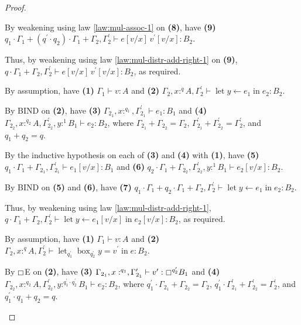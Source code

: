 \documentclass[acmsmall,screen,nonacm]{acmart}
\DeclareMathOperator{\llet}{\text{let}}
\DeclareMathOperator{\lin}{\text{in}}
\DeclareMathOperator{\bbox}{\text{box}}
\newcommand{\tee}{\vdash}
\begin{document}
\begin{proof}
\begin{description}
    By weakening using law \ref{law:mul-assoc-1} on \textbf{(8)}, have \textbf{(9)} $q_1 \cdot \Gamma_1 + (q^\prime \cdot q_2) \cdot \Gamma_1 + \Gamma_2, \Gamma_2^\prime \tee e[v/x] \, v^\prime[v/x] : B_2$.

    Thus, by weakening using law \ref{law:mul-distr-add-right-1} on \textbf{(9)}, $q \cdot \Gamma_1 + \Gamma_2, \Gamma_2^\prime \tee e[v/x] \, v^\prime[v/x] : B_2$, as required.
    \\
    \item[Case BIND.] 
    By assumption, have \textbf{(1)} $\Gamma_1 \tee v : A$ and \textbf{(2)} $\Gamma_2, x :^q A, \Gamma_2^\prime \tee \llet y \leftarrow e_1 \lin e_2 : B_2$.

    By BIND on \textbf{(2)}, have \textbf{(3)} $\Gamma_{2_1}, x :^{q_1}, \Gamma_{2_1}^\prime \tee e_1 : B_1$ and \textbf{(4)} $\Gamma_{2_2}, x :^{q_2} A, \Gamma_{2_2}^\prime, y :^1 B_1 \tee e_2 : B_2$, where $\Gamma_{2_1} + \Gamma_{2_2} = \Gamma_2$, $\Gamma_{2_1}^\prime + \Gamma_{2_2}^\prime = \Gamma_2^\prime$, and $q_1 + q_2 = q$.

    By the inductive hypothesis on each of \textbf{(3)} and \textbf{(4)} with \textbf{(1)}, have \textbf{(5)} $q_1 \cdot \Gamma_1 + \Gamma_{2_1}, \Gamma_{2_1}^\prime \tee e_1[v/x] : B_1$ and \textbf{(6)} $q_2 \cdot \Gamma_1 + \Gamma_{2_2}, \Gamma_{2_2}^\prime, y :^1 B_1 \tee e_2[v/x] : B_2$.

    By BIND on \textbf{(5)} and \textbf{(6)}, have \textbf{(7)} $q_1 \cdot \Gamma_1 + q_2 \cdot \Gamma_1 + \Gamma_2, \Gamma_2^\prime \tee \llet y \leftarrow e_1 \lin e_2 : B_2$.

    Thus, by weakening using law \ref{law:mul-distr-add-right-1}, $q \cdot \Gamma_1 + \Gamma_2, \Gamma_2^\prime \tee \llet y \leftarrow e_1[v/x] \lin e_2[v/x] : B_2$, as required.
    \\
    \item[Case $\boxempty$E.]
    By assumption, have \textbf{(1)} $\Gamma_1 \tee v : A$ and \textbf{(2)} $\Gamma_2, x :^q A, \Gamma_2^\prime \tee \llet_{q_1^\prime} \bbox_{q_2^\prime} y = v^\prime \lin e : B_2$.
    
    By $\boxempty$E on \textbf{(2)}, have \textbf{(3)} $\Gamma_{2_1}, x :^{q_1}, \Gamma_{2_1}^\prime \tee v^\prime : \boxempty^{q_2^\prime} B_1$ and \textbf{(4)} $\Gamma_{2_2}, x :^{q_2} A, \Gamma_{2_2}^\prime, y :^{q_1^\prime \cdot q_2^\prime} B_1 \tee e_2 : B_2$, where $q_1^\prime \cdot \Gamma_{2_1} + \Gamma_{2_2} = \Gamma_2$, $q_1^\prime \cdot \Gamma_{2_1}^\prime + \Gamma_{2_2}^\prime = \Gamma_2^\prime$, and $q_1^\prime \cdot q_1 + q_2 = q$.
    

\end{description}
\end{proof}
\end{document}
